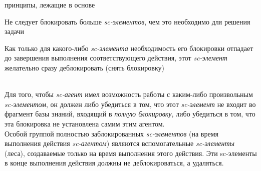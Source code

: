 \begin{SCn}
\begin{scnsubstruct}
\begin{scnrelfromlist}{принципы, лежащие в основе}
{                \begin{scnenumerate}
                    \item Не следует блокировать больше \textit{sc-элементов}, чем это необходимо для решения задачи
                    \item Как только для какого-либо \textit{sc-элемента} необходимость его блокировки отпадает до завершения выполнения соответствующего действия, этот \textit{sc-элемент} желательно сразу деблокировать (снять блокировку)
                \end{scnenumerate}
                ~\\Для того, чтобы \textit{sc-агент} имел возможность работы с каким-либо произвольным \textit{sc-элементом}, он должен либо убедиться в том, что этот \textit{sc-элемент} не входит во фрагмент базы знаний, входящий в \textit{полную блокировку}, либо убедиться в том, что эта блокировка не установлена самим этим агентом.~\\Особой группой полностью заблокированных \textit{sc-элементов} (на время выполнения действия \textit{\mbox{sc-агентом}}) являются вспомогательные \textit{sc-элементы} (леса), создаваемые только на время выполнения этого действия. Эти sc-элементы в конце выполнения действия должны не деблокироваться, а удаляться.
            }
        \end{scnrelfromlist}
        \begin{scnsubstruct}

\end{scnsubstruct}
\end{scnsubstruct}
\end{SCn}
